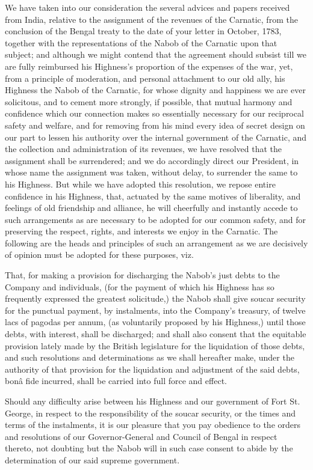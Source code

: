 We have taken into our consideration the several advices and papers received from India, relative to the assignment of the revenues of the Carnatic, from the conclusion of the Bengal treaty to the date of your letter in October, 1783, together with the representations of the Nabob of the Carnatic upon that subject; and although we might contend that the agreement should subsist till we are fully reimbursed his Highness's proportion of the expenses of the war, yet, from a principle of moderation, and personal attachment to our old ally, his Highness the Nabob of the Carnatic, for whose dignity and happiness we are ever solicitous, and to cement more strongly, if possible, that mutual harmony and confidence which our connection makes so essentially necessary for our reciprocal safety and welfare, and for removing from his mind every idea of secret design on our part to lessen his authority over the internal government of the Carnatic, and the collection and administration of its revenues, we have resolved that the assignment shall be surrendered; and we do accordingly direct our President, in whose name the assignment was taken, without delay, to surrender the same to his Highness. But while we have adopted this resolution, we repose entire confidence in his Highness, that, actuated by the same motives of liberality, and feelings of old friendship and alliance, he will cheerfully and instantly accede to such arrangements as are necessary to be adopted for our common safety, and for preserving the respect, rights, and interests we enjoy in the Carnatic. The following are the heads and principles of such an arrangement as we are decisively of opinion must be adopted for these purposes, viz.

That, for making a provision for discharging the Nabob's just debts to the Company and individuals, (for the payment of which his Highness has so frequently expressed the greatest solicitude,) the Nabob shall give soucar security for the punctual payment, by instalments, into the Company's treasury, of twelve lacs of pagodas per annum, (as voluntarily proposed by his Highness,) until those debts, with interest, shall be discharged; and shall also consent that the equitable provision lately made by the British legislature for the liquidation of those debts, and such resolutions and determinations as we shall hereafter make, under the authority of that provision for the liquidation and adjustment of the said debts, bonâ fide incurred, shall be carried into full force and effect.

Should any difficulty arise between his Highness and our government of Fort St. George, in respect to the responsibility of the soucar security, or the times and terms of the instalments, it is our pleasure that you pay obedience to the orders and resolutions of our Governor-General and Council of Bengal in respect thereto, not doubting but the Nabob will in such case consent to abide by the determination of our said supreme government.

